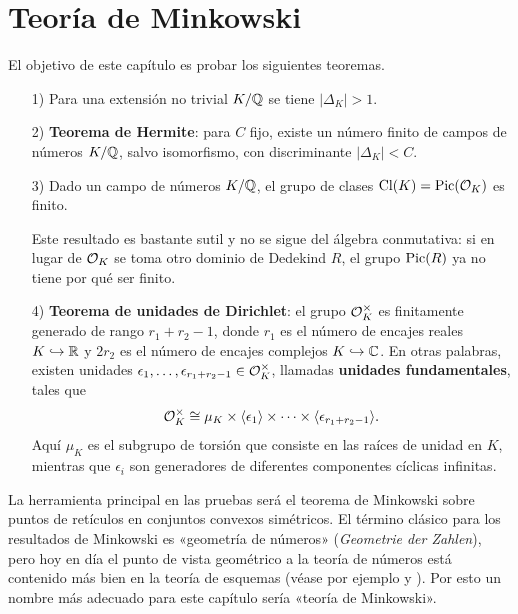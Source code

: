 \chapter{Teoría de Minkowski}


El objetivo de este capítulo es probar los siguientes teoremas.

\begin{enumerate}
\item[1)] Para una extensión no trivial $K/\mathbb{Q}$ se tiene $|\Delta_K| > 1$.

\item[2)] \textbf{Teorema de Hermite}: para $C$ fijo, existe un número finito de
  campos de números $K/\mathbb{Q}$, salvo isomorfismo, con discriminante
  $|\Delta_K| < C$.

\item[3)] Dado un campo de números $K/\mathbb{Q}$, el grupo de clases
  $\operatorname{Cl} (K) = \operatorname{Pic} (\mathcal{O}_K)$ es finito.

  Este resultado es bastante sutil y no se sigue del álgebra conmutativa:
  si en lugar de $\mathcal{O}_K$ se toma otro dominio de Dedekind $R$, el grupo
  $\operatorname{Pic} (R)$ ya no tiene por qué ser finito.

\item[4)] \textbf{Teorema de unidades de Dirichlet}: el grupo $\mathcal{O}_K^\times$ es
  finitamente generado de rango $r_1 + r_2 - 1$, donde $r_1$ es el número de
  encajes reales $K\hookrightarrow \mathbb{R}$ y $2r_2$ es el número de encajes
  complejos $K\hookrightarrow \mathbb{C}$. En otras palabras, existen unidades
  $\epsilon_1, \ldots, \epsilon_{r_1 + r_2 - 1} \in \mathcal{O}_K^\times$,
  llamadas \textbf{unidades fundamentales}, tales que
  $$\mathcal{O}_K^\times \cong \mu_K \times \langle\epsilon_1\rangle \times \cdots \times \langle\epsilon_{r_1+r_2-1}\rangle.$$
  Aquí $\mu_K$ es el subgrupo de torsión que consiste en las raíces de unidad
  en $K$, mientras que $\epsilon_i$ son generadores de diferentes componentes
  cíclicas infinitas.
\end{enumerate}

La herramienta principal en las pruebas será el teorema de Minkowski sobre
puntos de retículos en conjuntos convexos simétricos. El término clásico para
los resultados de Minkowski es «geometría de números»
(\emph{Geometrie der Zahlen}), pero hoy en día el punto de vista geométrico a
la teoría de números está contenido más bien en la teoría de esquemas (véase por
ejemplo \cite{Eisenbud-Harris} y \cite{Gortz-Wedhorn}). Por esto un nombre más
adecuado para este capítulo sería «teoría de Minkowski».


